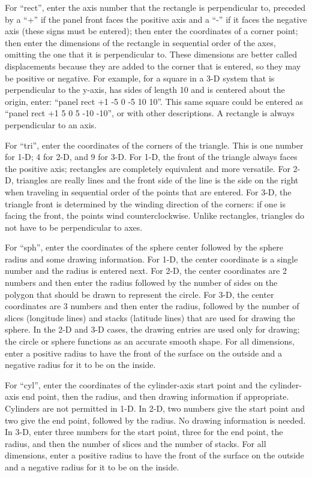 \documentclass {book}
\begin{document}
\begin{description}
For ``rect'', enter the axis number that the rectangle is perpendicular to, preceded by a ``+'' if the panel front faces the positive axis and a ``-'' if it faces the negative axis (these signs must be entered); then enter the coordinates of a corner point; then enter the dimensions of the rectangle in sequential order of the axes, omitting the one that it is perpendicular to. These dimensions are better called displacements because they are added to the corner that is entered, so they may be positive or negative. For example, for a square in a 3-D system that is perpendicular to the y-axis, has sides of length 10 and is centered about the origin, enter: ``panel rect +1 -5 0 -5 10 10''. This same square could be entered as ``panel rect +1 5 0 5 -10 -10'', or with other descriptions. A rectangle is always perpendicular to an axis.

For ``tri'', enter the coordinates of the corners of the triangle. This is one number for 1-D; 4 for 2-D, and 9 for 3-D. For 1-D, the front of the triangle always faces the positive axis; rectangles are completely equivalent and more versatile. For 2-D, triangles are really lines and the front side of the line is the side on the right when traveling in sequential order of the points that are entered. For 3-D, the triangle front is determined by the winding direction of the corners: if one is facing the front, the points wind counterclockwise. Unlike rectangles, triangles do not have to be perpendicular to axes.

For ``sph'', enter the coordinates of the sphere center followed by the sphere radius and some drawing information. For 1-D, the center coordinate is a single number and the radius is entered next. For 2-D, the center coordinates are 2 numbers and then enter the radius followed by the number of sides on the polygon that should be drawn to represent the circle. For 3-D, the center coordinates are 3 numbers and then enter the radius, followed by the number of slices (longitude lines) and stacks (latitude lines) that are used for drawing the sphere. In the 2-D and 3-D cases, the drawing entries are used only for drawing; the circle or sphere functions as an accurate smooth shape. For all dimensions, enter a positive radius to have the front of the surface on the outside and a negative radius for it to be on the inside.

For ``cyl'', enter the coordinates of the cylinder-axis start point and the cylinder-axis end point, then the radius, and then drawing information if appropriate. Cylinders are not permitted in 1-D. In 2-D, two numbers give the start point and two give the end point, followed by the radius. No drawing information is needed. In 3-D, enter three numbers for the start point, three for the end point, the radius, and then the number of slices and the number of stacks. For all dimensions, enter a positive radius to have the front of the surface on the outside and a negative radius for it to be on the inside.


\end{description}
\end{document}
